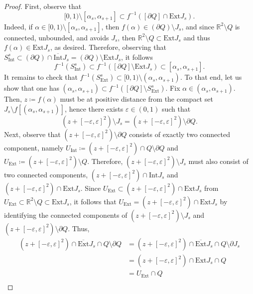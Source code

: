 \documentclass[a4paper, 11pt]{article} %
\theoremstyle{plain}
\newcommand{\Int}{\mathrm{Int}}
\newcommand{\clInt}{\overline{\mathrm{Int}}}
\newcommand{\Ext}{\mathrm{Ext}}
\newcommand{\clExt}{\overline{\mathrm{Ext}}}
\newcommand{\R}{\mathbb{R}}
\newcommand{\1}{\mathds 1}
\numberwithin{equation}{section}
\begin{document}
\begin{proof}
    First, observe that 
        \[[0,1)\setminus[\alpha_s,\alpha_{s+1}]\subset f^{-1}([\partial Q]\cap\Ext J_s).\]
    Indeed, if $\alpha\in[0,1)\setminus[\alpha_s,\alpha_{s+1}]$, then $f(\alpha)\in(\partial Q)\setminus J_s$, and since $\R^2\setminus Q$ is connected, unbounded, and avoids $J_s$, then $\R^2\setminus Q\subset\Ext J_s$ and thus $f(\alpha)\in \Ext J_s$, as desired. Therefore, observing that $S_\Int^s\subset(\partial Q)\cap\clInt J_s=(\partial Q)\setminus\Ext J_s$, it follows
        \begin{equation*}
            \label{eq_S_int}
            f^{-1}(S_\Int^s)\subset f^{-1}([\partial Q]\setminus \Ext J_s)\subset[\alpha_s, \alpha_{s+1}].
        \end{equation*}
    It remains to check that $f^{-1}(S_\Ext^s)\subset[0,1)\setminus(\alpha_s,\alpha_{s+1})$. To that end, let us show that one has $(\alpha_s, \alpha_{s+1})\subset f^{-1}([\partial Q]\setminus S_\Ext^s)$. Fix $\alpha\in (\alpha_s, \alpha_{s+1})$. Then, $z\coloneqq f(\alpha)$ must be at positive distance from the compact set $J_s\setminus f[(\alpha_s, \alpha_{s+1})]$, hence there exists $\varepsilon\in(0,1)$ such that
        \[(z+[-\varepsilon,\varepsilon]^2)\setminus J_s=(z+[-\varepsilon,\varepsilon]^2)\setminus\partial Q.\]
    Next, observe that $(z+[-\varepsilon,\varepsilon]^2)\setminus\partial Q$ consists of exactly two connected component, namely $U_\Int\coloneqq(z+[-\varepsilon,\varepsilon]^2)\cap Q\setminus\partial Q$ and $U_\Ext\coloneqq (z+[-\varepsilon,\varepsilon]^2)\setminus Q$. Therefore, $(z+[-\varepsilon,\varepsilon]^2)\setminus J_s$ must also consist of two connected components, $(z+[-\varepsilon,\varepsilon]^2)\cap\Int J_s$ and $(z+[-\varepsilon,\varepsilon]^2)\cap\Ext J_s$. Since $U_\Ext\subset(z+[-\varepsilon,\varepsilon]^2)\cap\Ext J_s$ from $U_\Ext\subset\R^2\setminus Q\subset\Ext J_s$, it follows that $U_\Ext=(z+[-\varepsilon,\varepsilon]^2)\cap\Ext J_s$ by identifying the connected components of $(z+[-\varepsilon,\varepsilon]^2)\setminus J_s$ and $(z+[-\varepsilon,\varepsilon]^2)\setminus\partial Q$. Thus,
        \begin{equation*}
            \begin{split}
                (z+[-\varepsilon,\varepsilon]^2)\cap\clExt J_s\cap Q\setminus\partial Q&=(z+[-\varepsilon,\varepsilon]^2)\cap\clExt J_s\cap Q\setminus\partial J_s\\
                &=(z+[-\varepsilon,\varepsilon]^2)\cap\Ext J_s\cap Q\\
                &=U_\Ext\cap Q\\

\end{split}
\end{equation*}
\end{proof}
\end{document}

